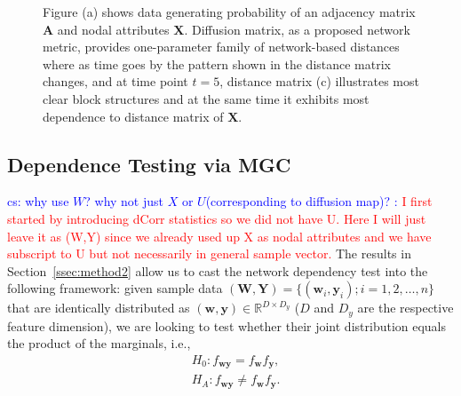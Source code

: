 \documentclass[11pt]{article}
\theoremstyle{definition}
\newcommand{\cs}[1]{\textcolor{blue}{cs: #1}}
\begin{document}
\begin{figure}[ht]
\begin{subfigure}[b]{0.23\textwidth}
		\caption{}
		\label{fig:d}
	\end{subfigure}
	\caption{Figure (a) shows data generating probability of an adjacency matrix $\mathbf{A}$ and nodal attributes $\mathbf{X}$. Diffusion matrix, as a proposed network metric, provides one-parameter family of network-based distances where as time goes by the pattern shown in the distance matrix changes, and at time point $t = 5$, distance matrix (c) illustrates most clear block structures and at the same time it exhibits most dependence to distance matrix of $\mathbf{X}$.}
	\label{fig:diffusions}
\end{figure}

	\vspace*{-0.4cm}
\subsection{Dependence Testing via MGC}
\label{ssec:method1}
\cs{why use $W$? why not just $X$ or $U$(corresponding to diffusion map)? :} \textcolor{red}{I first started by introducing dCorr statistics so we did not have U. Here I will just leave it as (W,Y) since we already used up X as nodal attributes and we have subscript to U but not necessarily in general sample vector.}
The results in Section~\ref{ssec:method2} allow us to cast the network dependency test into the following framework: given sample data $(\mathbf{W}, \mathbf{Y}) = \{  (\mathbf{w}_{i}, \mathbf{y}_{i} ) ; i = 1,2, \ldots, n \}$ that are identically distributed as $(\mathbf{w},\mathbf{y}) \in \mathbb{R}^{D \times D_y}$ ($D$ and $D_y$ are the respective feature dimension), we are looking to test whether their joint distribution equals the product of the marginals, i.e.,
\begin{align*}
& H_{0}: f_{\mathbf{w}\mathbf{y}}=f_{\mathbf{w}}f_{\mathbf{y}},\\
& H_{A}: f_{\mathbf{w}\mathbf{y}}\neq f_{\mathbf{w}}f_{\mathbf{y}}.
\end{align*}
\end{document}
